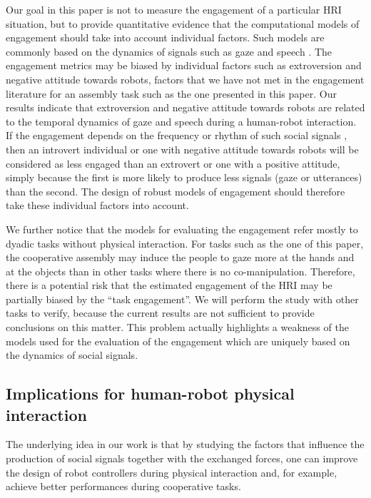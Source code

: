 \documentclass[twocolumn]{svjour3}          %
\begin{document}
Our goal in this paper is not to measure the engagement of a particular HRI situation, but to provide quantitative evidence that the computational models of engagement should take into account individual factors. Such models are commonly based on the dynamics of signals such as gaze and speech \cite{Anzalone2015engagement,sidner2004,rich2010recognizing}.
The engagement metrics may be biased by individual factors such as extroversion and negative attitude towards robots, factors that we have not met in the engagement literature for an assembly task such as the one presented in this paper.
Our results indicate that extroversion and negative attitude towards robots are related to the temporal dynamics of gaze and speech during a human-robot interaction.
If the engagement depends on the frequency or rhythm of such social signals \cite{rich2010recognizing}, then an introvert individual or one with negative attitude towards robots will be considered as less engaged than an extrovert or one with a positive attitude, simply because the first is more likely to produce less signals (gaze or utterances) than the second.
The design of robust models of engagement should therefore take these individual factors into account.

We further notice that the models for evaluating the engagement refer mostly to dyadic tasks without physical interaction. For tasks such as the one of this paper, the cooperative assembly may induce the people to gaze more at the hands and at the objects than in other tasks where there is no co-manipulation. 
Therefore, there is a potential risk that the estimated engagement of the HRI may be partially biased by the ``task engagement''. We will perform the study with other tasks to verify, because the current results are not sufficient to provide conclusions on this matter.
This problem actually highlights a weakness of the models used for the evaluation of the engagement which are uniquely based on the dynamics of social signals.


\subsection{Implications for human-robot physical interaction}

The underlying idea in our work is that by studying the factors that influence the production of social signals together with the exchanged forces, one can improve the design of robot controllers during physical interaction and, for example, achieve better performances during cooperative tasks.
\end{document}
